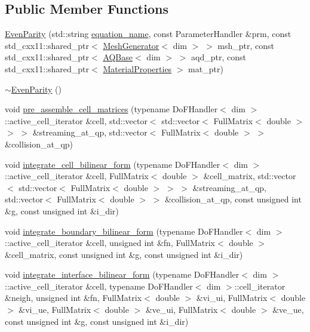 \subsection*{Public Member Functions}
\begin{DoxyCompactItemize}
\item 
\hyperlink{class_even_parity_a2877e7e239900be85cc84471fe670abd}{Even\+Parity} (std\+::string \hyperlink{class_equation_base_a0a72472959e531f5256400dec911f3a5}{equation\+\_\+name}, const Parameter\+Handler \&prm, const std\+\_\+cxx11\+::shared\+\_\+ptr$<$ \hyperlink{class_mesh_generator}{Mesh\+Generator}$<$ dim $>$ $>$ msh\+\_\+ptr, const std\+\_\+cxx11\+::shared\+\_\+ptr$<$ \hyperlink{class_a_q_base}{A\+Q\+Base}$<$ dim $>$ $>$ aqd\+\_\+ptr, const std\+\_\+cxx11\+::shared\+\_\+ptr$<$ \hyperlink{class_material_properties}{Material\+Properties} $>$ mat\+\_\+ptr)
\item 
\hyperlink{class_even_parity_a9c3caf641043e0a1e44632478946576b}{$\sim$\+Even\+Parity} ()
\item 
void \hyperlink{class_even_parity_a4cc64002161193e2227e962c9ecb8cf5}{pre\+\_\+assemble\+\_\+cell\+\_\+matrices} (typename Do\+F\+Handler$<$ dim $>$\+::active\+\_\+cell\+\_\+iterator \&cell, std\+::vector$<$ std\+::vector$<$ Full\+Matrix$<$ double $>$ $>$ $>$ \&streaming\+\_\+at\+\_\+qp, std\+::vector$<$ Full\+Matrix$<$ double $>$ $>$ \&collision\+\_\+at\+\_\+qp)
\item 
void \hyperlink{class_even_parity_adb381ea4f45e5ae3741b1d30a0de02b6}{integrate\+\_\+cell\+\_\+bilinear\+\_\+form} (typename Do\+F\+Handler$<$ dim $>$\+::active\+\_\+cell\+\_\+iterator \&cell, Full\+Matrix$<$ double $>$ \&cell\+\_\+matrix, std\+::vector$<$ std\+::vector$<$ Full\+Matrix$<$ double $>$ $>$ $>$ \&streaming\+\_\+at\+\_\+qp, std\+::vector$<$ Full\+Matrix$<$ double $>$ $>$ \&collision\+\_\+at\+\_\+qp, const unsigned int \&g, const unsigned int \&i\+\_\+dir)
\item 
void \hyperlink{class_even_parity_ae800cb49f85cf417167ca5385b50df6f}{integrate\+\_\+boundary\+\_\+bilinear\+\_\+form} (typename Do\+F\+Handler$<$ dim $>$\+::active\+\_\+cell\+\_\+iterator \&cell, unsigned int \&fn, Full\+Matrix$<$ double $>$ \&cell\+\_\+matrix, const unsigned int \&g, const unsigned int \&i\+\_\+dir)
\item 
void \hyperlink{class_even_parity_a0a6674c14f34f22c8ff383aee81ffabf}{integrate\+\_\+interface\+\_\+bilinear\+\_\+form} (typename Do\+F\+Handler$<$ dim $>$\+::active\+\_\+cell\+\_\+iterator \&cell, typename Do\+F\+Handler$<$ dim $>$\+::cell\+\_\+iterator \&neigh, unsigned int \&fn, Full\+Matrix$<$ double $>$ \&vi\+\_\+ui, Full\+Matrix$<$ double $>$ \&vi\+\_\+ue, Full\+Matrix$<$ double $>$ \&ve\+\_\+ui, Full\+Matrix$<$ double $>$ \&ve\+\_\+ue, const unsigned int \&g, const unsigned int \&i\+\_\+dir)

\end{DoxyCompactItemize}
